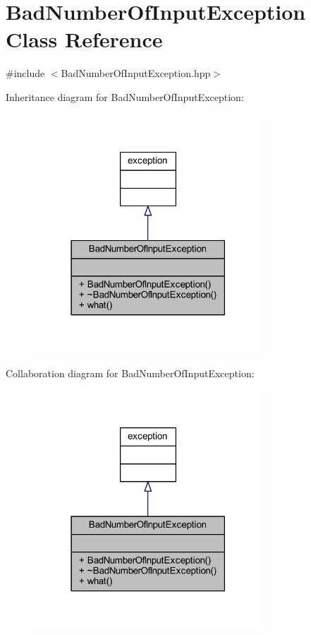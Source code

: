 \hypertarget{class_bad_number_of_input_exception}{}\section{Bad\+Number\+Of\+Input\+Exception Class Reference}
\label{class_bad_number_of_input_exception}


{\ttfamily \#include $<$Bad\+Number\+Of\+Input\+Exception.\+hpp$>$}



Inheritance diagram for Bad\+Number\+Of\+Input\+Exception\+:\nopagebreak
\begin{figure}[H]
\begin{center}
\leavevmode
\includegraphics[width=243pt]{class_bad_number_of_input_exception__inherit__graph}
\end{center}
\end{figure}


Collaboration diagram for Bad\+Number\+Of\+Input\+Exception\+:\nopagebreak
\begin{figure}[H]
\begin{center}
\leavevmode
\includegraphics[width=243pt]{class_bad_number_of_input_exception__coll__graph}
\end{center}
\end{figure}
